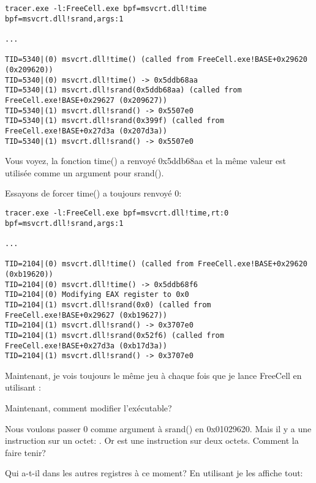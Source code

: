 \begin{lstlisting}
tracer.exe -l:FreeCell.exe bpf=msvcrt.dll!time bpf=msvcrt.dll!srand,args:1

...

TID=5340|(0) msvcrt.dll!time() (called from FreeCell.exe!BASE+0x29620 (0x209620))
TID=5340|(0) msvcrt.dll!time() -> 0x5ddb68aa
TID=5340|(1) msvcrt.dll!srand(0x5ddb68aa) (called from FreeCell.exe!BASE+0x29627 (0x209627))
TID=5340|(1) msvcrt.dll!srand() -> 0x5507e0
TID=5340|(1) msvcrt.dll!srand(0x399f) (called from FreeCell.exe!BASE+0x27d3a (0x207d3a))
TID=5340|(1) msvcrt.dll!srand() -> 0x5507e0
\end{lstlisting}

Vous voyez, la fonction time() a renvoyé 0x5ddb68aa et la même valeur est utilisée
comme un argument pour srand().

Essayons de forcer time() a toujours renvoyé 0:

\begin{lstlisting}
tracer.exe -l:FreeCell.exe bpf=msvcrt.dll!time,rt:0 bpf=msvcrt.dll!srand,args:1

...

TID=2104|(0) msvcrt.dll!time() (called from FreeCell.exe!BASE+0x29620 (0xb19620))
TID=2104|(0) msvcrt.dll!time() -> 0x5ddb68f6
TID=2104|(0) Modifying EAX register to 0x0
TID=2104|(1) msvcrt.dll!srand(0x0) (called from FreeCell.exe!BASE+0x29627 (0xb19627))
TID=2104|(1) msvcrt.dll!srand() -> 0x3707e0
TID=2104|(1) msvcrt.dll!srand(0x52f6) (called from FreeCell.exe!BASE+0x27d3a (0xb17d3a))
TID=2104|(1) msvcrt.dll!srand() -> 0x3707e0
\end{lstlisting}

Maintenant, je vois toujours le même jeu à chaque fois que je lance FreeCell en
utilisant \tracer:

\begin{figure}[H]
\centering
{}
\end{figure}

Maintenant, comment modifier l'exécutable?

Nous voulons passer 0 comme argument à srand() en 0x01029620.
Mais il y a une instruction sur un octet: .
Or  est une instruction sur deux octets. Comment la faire tenir?

Qui a-t-il dans les autres registres à ce moment? En utilisant  \tracer je les
affiche tout:

